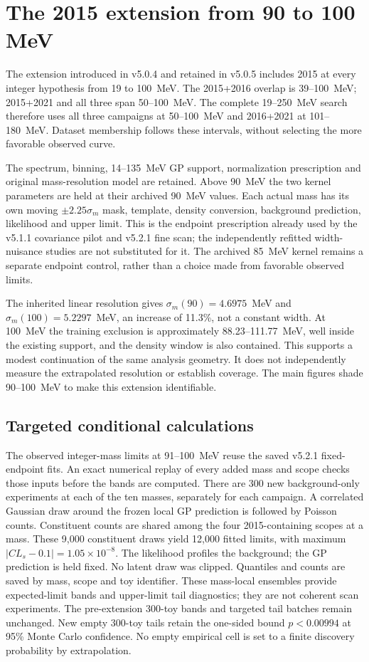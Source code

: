 \section{The 2015 extension from 90 to 100 MeV}
\label{app:v504-extension}
The extension introduced in v5.0.4 and retained in v5.0.5 includes 2015 at every integer hypothesis from 19 to 100~MeV.
The 2015+2016 overlap is 39--100~MeV; 2015+2021 and all three span
50--100~MeV. The complete 19--250~MeV search therefore uses all three
campaigns at 50--100~MeV and 2016+2021 at 101--180~MeV. Dataset membership
follows these intervals, without selecting the more favorable observed curve.

The spectrum, binning, 14--135~MeV GP support, normalization prescription
and original mass-resolution model are retained. Above 90~MeV the two
kernel parameters are held at their archived 90~MeV values. Each actual
mass has its own moving $\pm2.25\sigma_m$ mask, template, density conversion,
background prediction, likelihood and upper limit. This is the endpoint
prescription already used by the v5.1.1 covariance pilot and v5.2.1 fine scan;
the independently refitted width-nuisance studies are not substituted for it.
The archived 85~MeV kernel remains a separate endpoint control, rather than a
choice made from favorable observed limits.

The inherited linear resolution gives $\sigma_m(90)=4.6975$~MeV and
$\sigma_m(100)=5.2297$~MeV, an increase of 11.3\%, not a constant width.
At 100~MeV the training exclusion is approximately 88.23--111.77~MeV,
well inside the existing support, and the density window is also contained.
This supports a modest continuation of the same analysis geometry. It does
not independently measure the extrapolated resolution or establish coverage.
The main figures shade 90--100~MeV to make this extension identifiable.

\subsection{Targeted conditional calculations}
The observed integer-mass limits at 91--100~MeV reuse the saved v5.2.1
fixed-endpoint fits. An exact numerical replay of every added mass and scope
checks those inputs before the bands are computed. There are 300 new
background-only experiments at each of the ten masses, separately for each
campaign. A correlated Gaussian draw around the frozen local GP prediction
is followed by Poisson counts. Constituent counts are shared among the four
2015-containing scopes at a mass. These 9,000 constituent draws yield
12,000 fitted limits, with maximum $|CL_s-0.1|=1.05\times10^{-8}$.
The likelihood profiles the background; the GP prediction is held fixed.
No latent draw was clipped. Quantiles and counts are saved by mass, scope
and toy identifier. These mass-local ensembles provide expected-limit bands
and upper-limit tail diagnostics; they are not coherent scan experiments.
The pre-extension 300-toy bands and targeted tail batches remain unchanged.
New empty 300-toy tails retain the one-sided bound $p<0.00994$ at 95\%
Monte Carlo confidence. No empty empirical cell is set to a finite discovery
probability by extrapolation.

